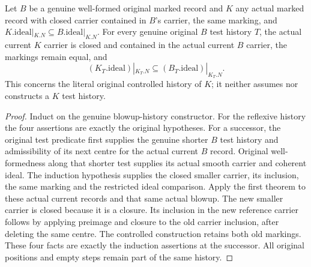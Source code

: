 \begin{theorem}
\label{hir:original-controlled-reference-restriction-history}
\leanok
Let $B$ be a genuine well-formed original marked record and $K$ any
actual marked record with closed carrier contained in $B$'s carrier,
the same marking, and $K.\mathrm{ideal}|_{K.N}\subseteq
B.\mathrm{ideal}|_{K.N}$. For every genuine original $B$ test history
$T$, the actual current $K$ carrier is closed and contained in the
actual current $B$ carrier, the markings remain equal, and
\[
 (K_T.\mathrm{ideal})|_{K_T.N}
       \subseteq (B_T.\mathrm{ideal})|_{K_T.N}.
\]
This concerns the literal original controlled history of $K$; it neither
assumes nor constructs a $K$ test history.
\end{theorem}
\begin{proof}
Induct on the genuine blowup-history constructor. For the reflexive
history the four assertions are exactly the original hypotheses.
For a successor, the original test predicate first supplies the genuine
shorter $B$ test history and admissibility of its next centre for the
actual current $B$ record. Original well-formedness along that shorter
test supplies its actual smooth carrier and coherent ideal. The
induction hypothesis supplies the closed smaller carrier, its inclusion,
the same marking and the restricted ideal comparison. Apply the first
theorem to these actual current records and that same actual blowup.
The new smaller carrier is closed because it is a closure. Its inclusion
in the new reference carrier follows by applying preimage and closure
to the old carrier inclusion, after deleting the same centre. The
controlled construction retains both old markings. These four facts
are exactly the induction assertions at the successor. All original
positions and empty steps remain part of the same history.
\end{proof}

